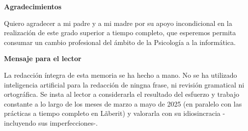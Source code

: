 \documentclass[a4paper,12pt]{report}
\begin{document}
	\clearpage
	\thispagestyle{empty}  %
	\begin{center}
		\vspace*{3cm}
		
		{\LARGE \textbf{Agradecimientos}} %
		
		\vspace{1cm}
		
		\begin{minipage}{0.8\textwidth}
			\large
			Quiero agradecer a mi padre y a mi madre por su apoyo incondicional en la realización de este grado superior a tiempo completo, que esperemos permita consumar un cambio profesional del ámbito de la Psicología a la informática.
		\end{minipage}
		
		\vspace{4cm}
		
		{\LARGE \textbf{Mensaje para el lector}} %
		
		\vspace{1cm}
		
		\begin{minipage}{0.8\textwidth}
			\large
			La redacción íntegra de esta memoria se ha hecho a mano. No se ha utilizado inteligencia artificial para la redacción de ningna frase, ni revisión gramatical ni ortográfica. Se insta al lector a considerarla el resultado del esfuerzo y trabajo constante a lo largo de los meses de marzo a mayo de 2025 (en paralelo con las prácticas a tiempo completo en Lãberit) y valorarla con su idiosincracia -incluyendo sus imperfecciones-.
		\end{minipage}
		
		\vspace*{4cm}
		
		

	\end{center}
	\clearpage
	
	
	
	
	
	
	
	
	
	
	
	
	
	
	
	
	
	
	
	
	
	
	
	
	
	
\end{document}
